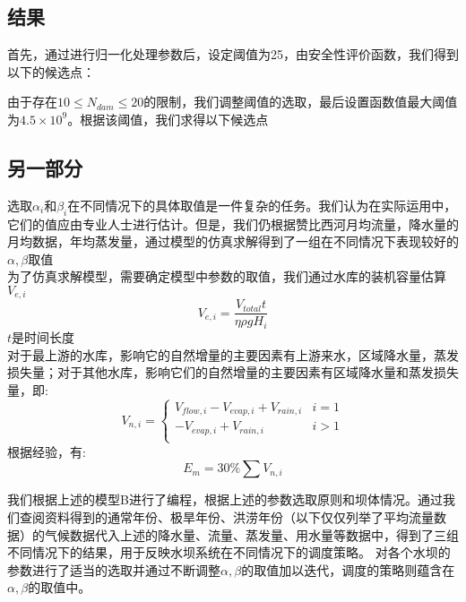 \documentclass[nocover]{cumcmart}
\begin{document}
\subsection{结果}
首先，通过进行归一化处理参数后，设定阈值为25，由安全性评价函数，我们得到以下的候选点：


由于存在$10 \le N_{dam} \le 20 $的限制，我们调整阈值的选取，最后设置函数值最大阈值为$4.5\times10^{9}$。根据该阈值，我们求得以下候选点



\subsection{另一部分}


选取$\alpha_{i}$和$\beta_{i}$在不同情况下的具体取值是一件复杂的任务。我们认为在实际运用中，它们的值应由专业人士进行估计。但是，我们仍根据赞比西河月均流量，降水量的月均数据，年均蒸发量，通过模型的仿真求解得到了一组在不同情况下表现较好的$\alpha, \beta$取值\\
为了仿真求解模型，需要确定模型中参数的取值，我们通过水库的装机容量估算$V_{e, i}$
\begin{equation}
V_{e, i} = \frac{V_{total}t}{\eta \rho gH_{i}}
\end{equation}
$t$是时间长度\\
对于最上游的水库，影响它的自然增量的主要因素有上游来水，区域降水量，蒸发损失量；对于其他水库，影响它们的自然增量的主要因素有区域降水量和蒸发损失量，即:
\begin{equation}
V_{n,i} = \left\{
\begin{array}{cc}
V_{flow,i} - V_{evap,i} + V_{rain,i} & i = 1 \\
-V_{evap,i} + V_{rain,i} & i > 1 \\
\end{array}
\right.
\end{equation}
根据经验，有:
\begin{equation}
E_{m} = 30\%\sum V_{n, i}
\end{equation}

我们根据上述的模型B进行了编程，根据上述的参数选取原则和坝体情况。通过我们查阅资料得到的通常年份、极旱年份、洪涝年份（以下仅仅列举了平均流量数据）的气候数据代入上述的降水量、流量、蒸发量、用水量等数据中，得到了三组不同情况下的结果，用于反映水坝系统在不同情况下的调度策略。
对各个水坝的参数进行了适当的选取并通过不断调整$\alpha, \beta$的取值加以迭代，调度的策略则蕴含在$\alpha,\beta$的取值中。
\end{document}
